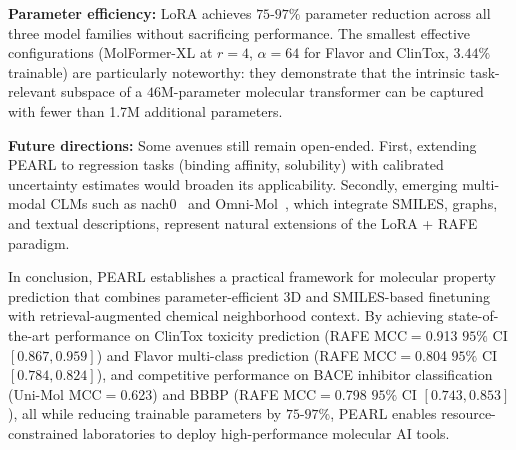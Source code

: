 \documentclass[9pt,twocolumn,conference]{IEEEtran}
\begin{document}
\textbf{Parameter efficiency:}
LoRA achieves $75$-$97\%$ parameter reduction across all three model families without sacrificing performance. The smallest effective configurations (MolFormer-XL at $r = 4$, $\alpha = 64$ for Flavor and ClinTox, $3.44\%$ trainable) are particularly noteworthy: they demonstrate that the intrinsic task-relevant subspace of a $46$M-parameter molecular transformer can be captured with fewer than 1.7M additional parameters.

\textbf{Future directions:}
Some avenues still remain open-ended. First, extending PEARL to regression tasks (binding affinity, solubility) with calibrated uncertainty estimates would broaden its applicability. Secondly, emerging multi-modal CLMs such as nach0~\cite{livne2024nach0} and Omni-Mol~\cite{hu2025omnimol}, which integrate SMILES, graphs, and textual descriptions, represent natural extensions of the LoRA + RAFE paradigm. 

In conclusion, PEARL establishes a practical framework for molecular property prediction that combines parameter-efficient 3D and SMILES-based finetuning with retrieval-augmented chemical neighborhood context. By achieving state-of-the-art performance on ClinTox toxicity prediction (RAFE MCC$=$0.913 $95\%$ CI $[0.867, 0.959]$) and Flavor multi-class prediction (RAFE MCC$=$0.804 $95\%$ CI $[0.784, 0.824]$), and competitive performance on BACE inhibitor classification (Uni-Mol MCC$=$0.623) and BBBP (RAFE MCC$=$0.798 $95\%$ CI $[0.743, 0.853]$), all while reducing trainable parameters by $75$-$97\%$, PEARL enables resource-constrained laboratories to deploy high-performance molecular AI tools.
\end{document}
